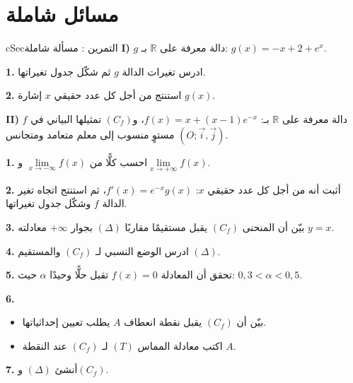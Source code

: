 \documentclass[12pt,a4paper]{article}
\newenvironment{BOX}[2]{\begin{otherlanguage}{english}\begin{arbox}{#1}{#2}}{\end{arbox}\end{otherlanguage}}
\newcounter{exo}
\newenvironment{tamrin}[1]{\stepcounter{exo}\begin{BOX}{cSec}{التمرين \theexo: #1}}{\end{BOX}}
\newcommand{\R}{\mathbb{R}}
\newenvironment{sq}{\begin{itemize}[leftmargin=2.4em,itemsep=3pt]}{\end{itemize}}
\newcommand{\qa}{\item[(أ)]}\newcommand{\qb}{\item[(ب)]}\newcommand{\qc}{\item[(جـ)]}\newcommand{\qd}{\item[(د)]}\newcommand{\qe}{\item[(هـ)]}
\newcommand{\QQ}[1]{\par\smallskip\textbf{#1.} }
\begin{document}
\section{مسائل شاملة}
\begin{tamrin}{مسألة شاملة}
\textbf{I)} $g$ دالة معرفة على $\R$ بـ: $g(x)=-x+2+e^{x}$.
\QQ{1} ادرس تغيرات الدالة $g$ ثم شكّل جدول تغيراتها.
\QQ{2} استنتج من أجل كل عدد حقيقي $x$ إشارة $g(x)$.

\textbf{II)} $f$ دالة معرفة على $\R$ بـ: $f(x)=x+(x-1)e^{-x}$، و$(C_f)$ تمثيلها البياني في مستوٍ منسوب إلى معلم متعامد ومتجانس $(O;\vec i,\vec j)$.
\QQ{1} احسب كلًّا من $\lim\limits_{x\to-\infty}f(x)$ و$\lim\limits_{x\to+\infty}f(x)$.
\QQ{2} أثبت أنه من أجل كل عدد حقيقي $x$: $f'(x)=e^{-x}g(x)$، ثم استنتج اتجاه تغير الدالة $f$ وشكّل جدول تغيراتها.
\QQ{3} بيّن أن المنحنى $(C_f)$ يقبل مستقيمًا مقاربًا $(\Delta)$ بجوار $+\infty$ معادلته $y=x$.
\QQ{4} ادرس الوضع النسبي لـ $(C_f)$ والمستقيم $(\Delta)$.
\QQ{5} تحقق أن المعادلة $f(x)=0$ تقبل حلًّا وحيدًا $\alpha$ حيث: $0{,}3<\alpha<0{,}5$.
\QQ{6}
\begin{sq}
\qa بيّن أن $(C_f)$ يقبل نقطة انعطاف $A$ يطلب تعيين إحداثياتها.
\qb اكتب معادلة المماس $(T)$ لـ $(C_f)$ عند النقطة $A$.
\end{sq}
\QQ{7} أنشئ $(\Delta)$ و$(C_f)$.
\end{tamrin}
\end{document}
